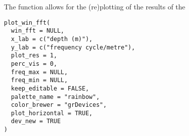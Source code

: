 \documentclass[a4paper]{book}
\begin{document}
%
\begin{Description}
The  function allows for the (re)plotting of the results of the 
\end{Description}
%
\begin{Usage}
\begin{verbatim}
plot_win_fft(
  win_fft = NULL,
  x_lab = c("depth (m)"),
  y_lab = c("frequency cycle/metre"),
  plot_res = 1,
  perc_vis = 0,
  freq_max = NULL,
  freq_min = NULL,
  keep_editable = FALSE,
  palette_name = "rainbow",
  color_brewer = "grDevices",
  plot_horizontal = TRUE,
  dev_new = TRUE
)
\end{verbatim}
\end{Usage}
%
\end{document}

